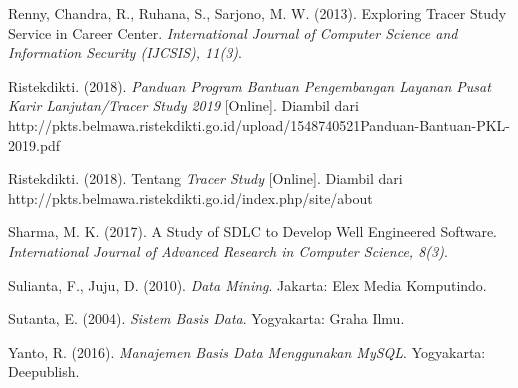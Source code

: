 \documentclass{jtetiskripsi}
\begin{document}
\begin{thebibliography}{99}
 Renny, Chandra, R., Ruhana, S., Sarjono, M. W. (2013). Exploring Tracer Study Service in Career Center. \textit{International Journal of Computer Science and Information Security (IJCSIS), 11(3)}.

 Ristekdikti. (2018). \textit{Panduan Program Bantuan Pengembangan Layanan Pusat Karir Lanjutan/Tracer Study 2019} [Online]. Diambil dari http://pkts.belmawa.ristekdikti.go.id/upload/1548740521Panduan-Bantuan-PKL-2019.pdf

 Ristekdikti. (2018). Tentang \textit{Tracer Study} [Online]. Diambil dari http://pkts.belmawa.ristekdikti.go.id/index.php/site/about

 Sharma, M. K. (2017). A Study of SDLC to Develop Well Engineered Software. \textit{International Journal of Advanced Research in Computer Science, 8(3)}.

 Sulianta, F., Juju, D. (2010). \textit{Data Mining}. Jakarta: Elex Media Komputindo.

 Sutanta, E. (2004). \textit{Sistem Basis Data}. Yogyakarta: Graha Ilmu.

 Yanto, R. (2016). \textit{Manajemen Basis Data Menggunakan MySQL}. Yogyakarta: Deepublish.

	
		
	
\end{thebibliography}



\end{document}
